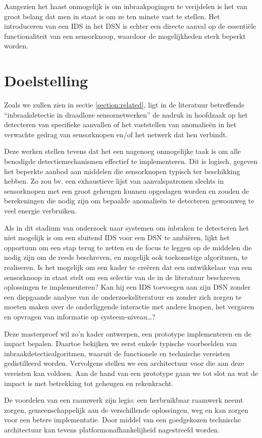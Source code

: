 Aangezien het haast onmogelijk is om inbraakpogingen te verijdelen is het van
groot belang dat men in staat is om ze ten minste vast te stellen. Het
introduceren van een IDS in het DSN is echter een directe aanval op de
essenti\"ele functionaliteit van een sensorknoop, waardoor de mogelijkheden
sterk beperkt worden.

\section{Doelstelling}
\label{section:doelstelling}

Zoals we zullen zien in sectie \ref{section:related}, ligt in de literatuur
betreffende ``inbraakdetectie in draadloze sensornetwerken'' de nadruk in
hoofdzaak op het detecteren van specifieke aanvallen of het vaststellen van
anomalie\"en in het verwachte gedrag van sensorknopen en/of het netwerk dat hen
verbindt.

Deze werken stellen tevens dat het een nagenoeg onmogelijke taak is om alle
benodigde detectiemechanismen effectief te implementeren. Dit is logisch,
gegeven het beperkte aanbod aan middelen die sensorknopen typisch ter
beschikking hebben. Zo zou bv. een exhaustieve lijst van aanvalspatronen
slechts in sensorknopen met een groot geheugen kunnen opgeslagen worden en
zouden de berekeningen die nodig zijn om bepaalde anomalie\"en te detecteren
gewoonweg te veel energie verbruiken.

Als in dit stadium van onderzoek naar systemen om inbraken te detecteren het
niet mogelijk is om een sluitend IDS voor een DSN te ambi\"eren, lijkt het
opportuun om een stap terug te zetten en de focus te leggen op de middelen die
nodig zijn om de reeds beschreven, en mogelijk ook toekomstige algoritmen, te
realiseren. Is het mogelijk om een kader te cre\"eren dat een ontwikkelaar van
een sensorknoop in staat stelt om een selectie van de in de literatuur
beschreven oplossingen te implementeren? Kan hij een IDS toevoegen aan zijn DSN
zonder een diepgaande analyse van de onderzoeksliteratuur en zonder zich zorgen
te moeten maken over de onderliggende interactie met andere knopen, het
vergaren en opvragen van informatie op systeem-niveau\dots?

Deze masterproef wil zo'n kader ontwerpen, een prototype implementeren en de
impact bepalen. Daartoe bekijken we eerst enkele typische voorbeelden van
inbraakdetectiealgoritmen, waaruit de functionele en technische vereisten
gedistilleerd worden. Vervolgens stellen we een architectuur voor die aan deze
vereisten kan voldoen. Aan de hand van een prototype gaan we tot slot na wat de
impact is met betrekking tot geheugen en rekenkracht.

De voordelen van een raamwerk zijn legio: een herbruikbaar raamwerk neemt
zorgen, gemeenschappelijk aan de verschillende oplossingen, weg en kan zorgen
voor een betere implementatie. Door middel van een goedgekozen technische
architectuur kan tevens platformonafhankelijheid nagestreefd worden.
